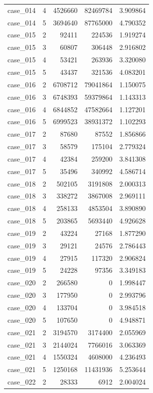 \begin{longtable}{lrrrr}
case\_014 & 4 & 4526660 & 82469784 & 3.909864 \\
case\_014 & 5 & 3694640 & 87765000 & 4.790352 \\
case\_015 & 2 & 92411 & 224536 & 1.919274 \\
case\_015 & 3 & 60807 & 306448 & 2.916802 \\
case\_015 & 4 & 53421 & 263936 & 3.320080 \\
case\_015 & 5 & 43437 & 321536 & 4.083201 \\
case\_016 & 2 & 6708712 & 79041864 & 1.150075 \\
case\_016 & 3 & 6748393 & 59379864 & 1.143313 \\
case\_016 & 4 & 6844852 & 47582664 & 1.127201 \\
case\_016 & 5 & 6999523 & 38931372 & 1.102293 \\
case\_017 & 2 & 87680 & 87552 & 1.856866 \\
case\_017 & 3 & 58579 & 175104 & 2.779324 \\
case\_017 & 4 & 42384 & 259200 & 3.841308 \\
case\_017 & 5 & 35496 & 340992 & 4.586714 \\
case\_018 & 2 & 502105 & 3191808 & 2.000313 \\
case\_018 & 3 & 338272 & 3867008 & 2.969111 \\
case\_018 & 4 & 258133 & 4853504 & 3.890890 \\
case\_018 & 5 & 203865 & 5693440 & 4.926628 \\
case\_019 & 2 & 43224 & 27168 & 1.877290 \\
case\_019 & 3 & 29121 & 24576 & 2.786443 \\
case\_019 & 4 & 27915 & 117320 & 2.906824 \\
case\_019 & 5 & 24228 & 97356 & 3.349183 \\
case\_020 & 2 & 266580 & 0 & 1.998447 \\
case\_020 & 3 & 177950 & 0 & 2.993796 \\
case\_020 & 4 & 133704 & 0 & 3.984518 \\
case\_020 & 5 & 107650 & 0 & 4.948871 \\
case\_021 & 2 & 3194570 & 3174400 & 2.055969 \\
case\_021 & 3 & 2144024 & 7766016 & 3.063369 \\
case\_021 & 4 & 1550324 & 4608000 & 4.236493 \\
case\_021 & 5 & 1250168 & 11431936 & 5.253644 \\
case\_022 & 2 & 28333 & 6912 & 2.004024 \\

\end{longtable}
